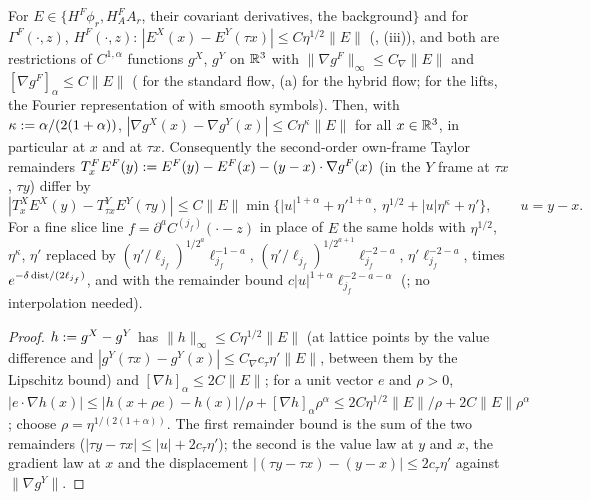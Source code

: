 \begin{lemma}\label{rot:h1s:E}
For $E\in\{H^F\phi_r,H^F_AA_r$, their covariant derivatives, the background$\}$ and for $\Gamma^F(\cdot,z)$, $H^F(\cdot,z)$: $|E^X(x)-E^Y(\tau x)|\le C\eta^{1/2}\|E\|$ (, (iii)), and both are restrictions of $C^{1,\alpha}$ functions $g^X$, $g^Y$ on $\mathbb R^3$ with $\|\nabla g^F\|_\infty\le C_\nabla\|E\|$ and $[\nabla g^F]_\alpha\le C\|E\|$ (\cite[Thm.~3.3, (3.8)]{K1} for the standard flow, (a) for the hybrid flow; for the lifts, the Fourier representation of  with smooth symbols). Then, with $\kappa:=\alpha/(2(1+\alpha))$, $|\nabla g^X(x)-\nabla g^Y(x)|\le C\eta^\kappa\|E\|$ for all $x\in\mathbb R^3$, in particular at $x$ and at $\tau x$. Consequently the second-order own-frame Taylor remainders $T^F_xE^F(y):= E^F(y)-E^F(x)-(y-x)\cdot\nabla g^F(x)$ (in the $Y$ frame at $\tau x$, $\tau y$) differ by
\[
|T^X_xE^X(y)-T^Y_{\tau x}E^Y(\tau y)|\le C\|E\|\min\{|u|^{1+\alpha}+\eta'^{1+\alpha},\ \eta^{1/2}+|u|\eta^\kappa+\eta'\},\qquad u=y-x .
\]
For a fine slice line $f=\partial^aC^{(j_f)}(\cdot-z)$ in place of $E$ the same holds with $\eta^{1/2}$, $\eta^\kappa$, $\eta'$ replaced by $(\eta'/\ell_{j_f})^{1/2^a}\ell_{j_f}^{-1-a}$, $(\eta'/\ell_{j_f})^{1/2^{a+1}}\ell_{j_f}^{-2-a}$, $\eta'\ell_{j_f}^{-2-a}$, times $e^{-\delta\,{\rm dist}/(2\ell_{j_f})}$, and with the remainder bound $c|u|^{1+\alpha}\ell_{j_f}^{-2-a-\alpha}$ (; no interpolation needed).
\end{lemma}
\begin{proof}
$h:= g^X-g^Y$ has $\|h\|_\infty\le C\eta^{1/2}\|E\|$ (at lattice points by the value difference and $|g^Y(\tau x)-g^Y(x)|\le C_\nabla c_\tau\eta'\|E\|$, between them by the Lipschitz bound) and $[\nabla h]_\alpha\le2C\|E\|$; for a unit vector $e$ and $\rho>0$, $|e\cdot\nabla h(x)|\le|h(x+\rho e)-h(x)|/\rho+[\nabla h]_\alpha\rho^\alpha\le2C\eta^{1/2}\|E\|/\rho+2C\|E\|\rho^\alpha$; choose $\rho=\eta^{1/(2(1+\alpha))}$. The first remainder bound is the sum of the two remainders ($|\tau y-\tau x|\le|u|+2c_\tau\eta'$); the second is the value law at $y$ and $x$, the gradient law at $x$ and the displacement $|(\tau y-\tau x)-(y-x)|\le2c_\tau\eta'$ against $\|\nabla g^Y\|$.
\end{proof}

